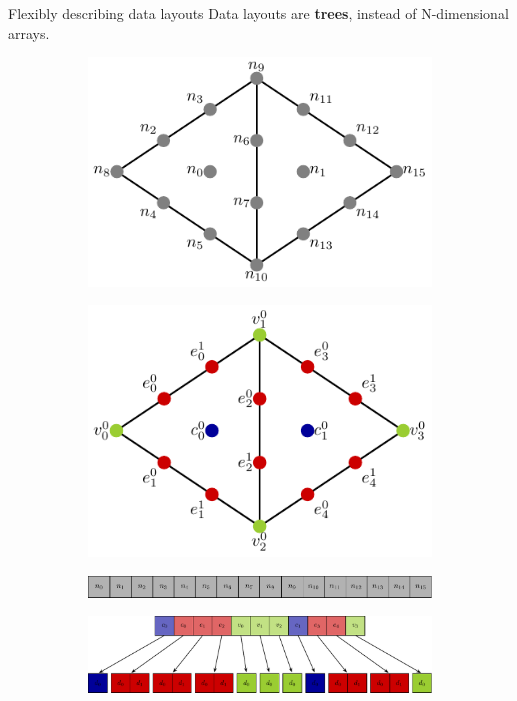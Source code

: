 \documentclass[aspectratio=169]{beamer}
\begin{document}
\begin{frame}{Flexibly describing data layouts}
  Data layouts are \textbf{trees}, instead of N-dimensional arrays.

  \begin{figure}
    \centering
    \begin{subfigure}{.49\textwidth}
      \centering
      \includegraphics[width=.8\textwidth]{two_cell_mesh_lagrange_nodal.pdf}
    \end{subfigure}
    \begin{subfigure}{.49\textwidth}
      \centering
      \includegraphics[width=.8\textwidth]{two_cell_mesh_lagrange.pdf}
    \end{subfigure}

    \begin{subfigure}{.49\textwidth}
      \centering
      \includegraphics[width=\textwidth]{two_cell_mesh_lagrange_data_layout_flat_nodal.pdf}
    \end{subfigure}
    \begin{subfigure}{.49\textwidth}
      \centering
      \includegraphics[width=\textwidth]{two_cell_mesh_lagrange_data_layout_nested.pdf}
    \end{subfigure}
  \end{figure}
\end{frame}
\end{document}
